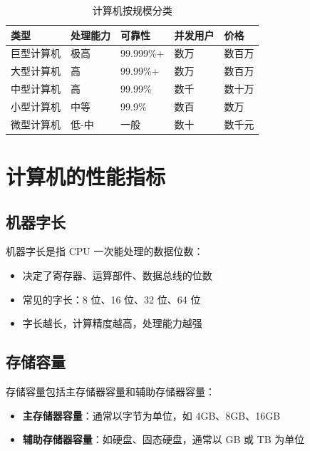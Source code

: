\documentclass[12pt,UTF8]{ctexbook}
\begin{document}
\begin{table}[htbp]
    \centering
    \caption{计算机按规模分类}
    \begin{tabular}{|p{2cm}|p{2cm}|p{2cm}|p{2cm}|p{2cm}|}
        \hline
        \textbf{类型} & \textbf{处理能力} & \textbf{可靠性} & \textbf{并发用户} & \textbf{价格} \\
        \hline
        巨型计算机 & 极高 & 99.999\%+ & 数万 & 数百万 \\
        \hline
        大型计算机 & 高 & 99.99\%+ & 数万 & 数百万 \\
        \hline
        中型计算机 & 高 & 99.99\% & 数千 & 数十万 \\
        \hline
        小型计算机 & 中等 & 99.9\% & 数百 & 数万 \\
        \hline
        微型计算机 & 低-中 & 一般 & 数十 & 数千元 \\
        \hline
    \end{tabular}
\end{table}

\chapter{计算机的性能指标}
\label{chap:performance}

\section{机器字长}

机器字长是指 CPU 一次能处理的数据位数：

\begin{itemize}[leftmargin=2cm]
    \item 决定了寄存器、运算部件、数据总线的位数
    \item 常见的字长：8 位、16 位、32 位、64 位
    \item 字长越长，计算精度越高，处理能力越强
\end{itemize}

\section{存储容量}

存储容量包括主存储器容量和辅助存储器容量：

\begin{itemize}[leftmargin=2cm]
    \item \textbf{主存储器容量}：通常以字节为单位，如 4GB、8GB、16GB
    \item \textbf{辅助存储器容量}：如硬盘、固态硬盘，通常以 GB 或 TB 为单位
\end{itemize}
\end{document}
